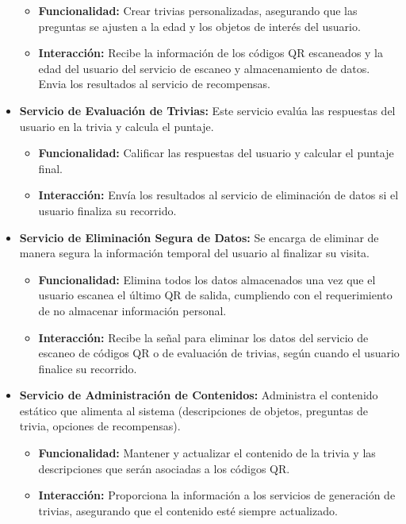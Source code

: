 \documentclass{report}
\begin{document}
\begin{itemize}
\begin{itemize}
        \item \textbf{Funcionalidad:} Crear trivias personalizadas, asegurando que las preguntas se ajusten a la edad y los objetos de interés del usuario.
        \item \textbf{Interacción:} Recibe la información de los códigos QR escaneados y la edad del usuario del servicio de escaneo y almacenamiento de datos. Envia los resultados al servicio de recompensas.
    \end{itemize}
    \item \textbf{Servicio de Evaluación de Trivias:} Este servicio evalúa las respuestas del usuario en la trivia y calcula el puntaje.
    \begin{itemize}
        \item \textbf{Funcionalidad:} Calificar las respuestas del usuario y calcular el puntaje final.
        \item \textbf{Interacción:} Envía los resultados al servicio de eliminación de datos si el usuario finaliza su recorrido.
    \end{itemize}
    \item \textbf{Servicio de Eliminación Segura de Datos:} Se encarga de eliminar de manera segura la información temporal del usuario al finalizar su visita.
    \begin{itemize}
        \item \textbf{Funcionalidad:} Elimina todos los datos almacenados una vez que el usuario escanea el último QR de salida, cumpliendo con el requerimiento de no almacenar información personal.
        \item \textbf{Interacción:} Recibe la señal para eliminar los datos del servicio de escaneo de códigos QR o de evaluación de trivias, según cuando el usuario finalice su recorrido.
    \end{itemize}
    \item \textbf{Servicio de Administración de Contenidos:} Administra el contenido estático que alimenta al sistema (descripciones de objetos, preguntas de trivia, opciones de recompensas).
    \begin{itemize}
        \item \textbf{Funcionalidad:} Mantener y actualizar el contenido de la trivia y las descripciones que serán asociadas a los códigos QR.
        \item \textbf{Interacción:} Proporciona la información a los servicios de generación de trivias, asegurando que el contenido esté siempre actualizado.
    \end{itemize}
\end{itemize}
\end{document}
